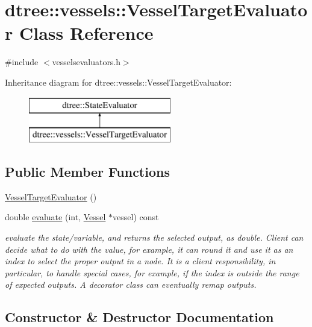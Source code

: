 \hypertarget{classdtree_1_1vessels_1_1_vessel_target_evaluator}{}\section{dtree\+::vessels\+::Vessel\+Target\+Evaluator Class Reference}
\label{classdtree_1_1vessels_1_1_vessel_target_evaluator}


{\ttfamily \#include $<$vesselsevaluators.\+h$>$}

Inheritance diagram for dtree\+::vessels\+::Vessel\+Target\+Evaluator\+:\begin{figure}[H]
\begin{center}
\leavevmode
\includegraphics[height=2.000000cm]{da/d28/classdtree_1_1vessels_1_1_vessel_target_evaluator}
\end{center}
\end{figure}
\subsection*{Public Member Functions}
\begin{DoxyCompactItemize}
\item 
\mbox{\hyperlink{classdtree_1_1vessels_1_1_vessel_target_evaluator_a9decb25a058768e0733e580297465274}{Vessel\+Target\+Evaluator}} ()
\item 
double \mbox{\hyperlink{classdtree_1_1vessels_1_1_vessel_target_evaluator_aec3df95c80f6272021c84c92b900741a}{evaluate}} (int, \mbox{\hyperlink{class_vessel}{Vessel}} $\ast$vessel) const
\begin{DoxyCompactList}\small\item\em evaluate the state/variable, and returns the selected output, as double. Client can decide what to do with the value, for example, it can round it and use it as an index to select the proper output in a node. It is a client responsibility, in particular, to handle special cases, for example, if the index is outside the range of expected outputs. A decorator class can eventually remap outputs. \end{DoxyCompactList}\end{DoxyCompactItemize}


\subsection{Constructor \& Destructor Documentation}
\mbox{\label{classdtree_1_1vessels_1_1_vessel_target_evaluator_a9decb25a058768e0733e580297465274}} 
